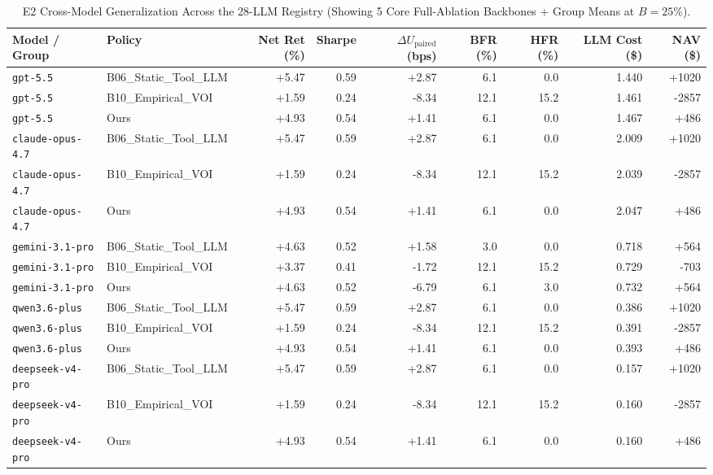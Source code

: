 \begin{table}[t]
\centering
\caption{E2 Cross-Model Generalization Across the 28-LLM Registry (Showing 5 Core Full-Ablation Backbones + Group Means at $B = 25\%$).}
\label{tab:e2_cross_model}
\footnotesize
\begin{tabular}{llrrrrrrr}
\toprule
Model / Group & Policy & Net Ret (\%) & Sharpe & $\Delta U_{\text{paired}}$ (bps) & BFR (\%) & HFR (\%) & LLM Cost (\$) & NAV (\$) \\
\midrule
\texttt{gpt-5.5} & B06\_Static\_Tool\_LLM & +5.47 & 0.59 & +2.87 & 6.1 & 0.0 & 1.440 & +1020 \\
\texttt{gpt-5.5} & B10\_Empirical\_VOI & +1.59 & 0.24 & -8.34 & 12.1 & 15.2 & 1.461 & -2857 \\
\texttt{gpt-5.5} & Ours & +4.93 & 0.54 & +1.41 & 6.1 & 0.0 & 1.467 & +486 \\
\texttt{claude-opus-4.7} & B06\_Static\_Tool\_LLM & +5.47 & 0.59 & +2.87 & 6.1 & 0.0 & 2.009 & +1020 \\
\texttt{claude-opus-4.7} & B10\_Empirical\_VOI & +1.59 & 0.24 & -8.34 & 12.1 & 15.2 & 2.039 & -2857 \\
\texttt{claude-opus-4.7} & Ours & +4.93 & 0.54 & +1.41 & 6.1 & 0.0 & 2.047 & +486 \\
\texttt{gemini-3.1-pro} & B06\_Static\_Tool\_LLM & +4.63 & 0.52 & +1.58 & 3.0 & 0.0 & 0.718 & +564 \\
\texttt{gemini-3.1-pro} & B10\_Empirical\_VOI & +3.37 & 0.41 & -1.72 & 12.1 & 15.2 & 0.729 & -703 \\
\texttt{gemini-3.1-pro} & Ours & +4.63 & 0.52 & -6.79 & 6.1 & 3.0 & 0.732 & +564 \\
\texttt{qwen3.6-plus} & B06\_Static\_Tool\_LLM & +5.47 & 0.59 & +2.87 & 6.1 & 0.0 & 0.386 & +1020 \\
\texttt{qwen3.6-plus} & B10\_Empirical\_VOI & +1.59 & 0.24 & -8.34 & 12.1 & 15.2 & 0.391 & -2857 \\
\texttt{qwen3.6-plus} & Ours & +4.93 & 0.54 & +1.41 & 6.1 & 0.0 & 0.393 & +486 \\
\texttt{deepseek-v4-pro} & B06\_Static\_Tool\_LLM & +5.47 & 0.59 & +2.87 & 6.1 & 0.0 & 0.157 & +1020 \\
\texttt{deepseek-v4-pro} & B10\_Empirical\_VOI & +1.59 & 0.24 & -8.34 & 12.1 & 15.2 & 0.160 & -2857 \\
\texttt{deepseek-v4-pro} & Ours & +4.93 & 0.54 & +1.41 & 6.1 & 0.0 & 0.160 & +486 \\
\bottomrule
\end{tabular}
\end{table}

